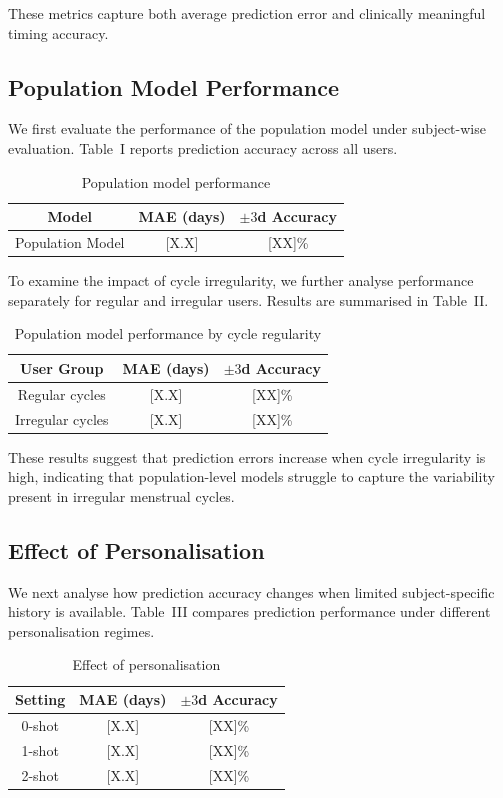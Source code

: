 \documentclass[conference]{IEEEtran}
\begin{document}
These metrics capture both average prediction error and clinically meaningful timing accuracy.

\subsection{Population Model Performance}

We first evaluate the performance of the population model under subject-wise evaluation. Table~I reports prediction accuracy across all users.

\begin{table}[h]
\centering
\caption{Population model performance}
\begin{tabular}{ccc}
\hline
Model & MAE (days) & $\pm3$d Accuracy \\
\hline
Population Model & [X.X] & [XX]\% \\
\hline
\end{tabular}
\end{table}

To examine the impact of cycle irregularity, we further analyse performance separately for regular and irregular users. Results are summarised in Table~II.

\begin{table}[h]
\centering
\caption{Population model performance by cycle regularity}
\begin{tabular}{ccc}
\hline
User Group & MAE (days) & $\pm3$d Accuracy \\
\hline
Regular cycles & [X.X] & [XX]\% \\
Irregular cycles & [X.X] & [XX]\% \\
\hline
\end{tabular}
\end{table}

These results suggest that prediction errors increase when cycle irregularity is high, indicating that population-level models struggle to capture the variability present in irregular menstrual cycles.

\subsection{Effect of Personalisation}

We next analyse how prediction accuracy changes when limited subject-specific history is available. Table~III compares prediction performance under different personalisation regimes.

\begin{table}[h]
\centering
\caption{Effect of personalisation}
\begin{tabular}{ccc}
\hline
Setting & MAE (days) & $\pm3$d Accuracy \\
\hline
0-shot & [X.X] & [XX]\% \\
1-shot & [X.X] & [XX]\% \\
2-shot & [X.X] & [XX]\% \\
\hline
\end{tabular}
\end{table}
\end{document}
